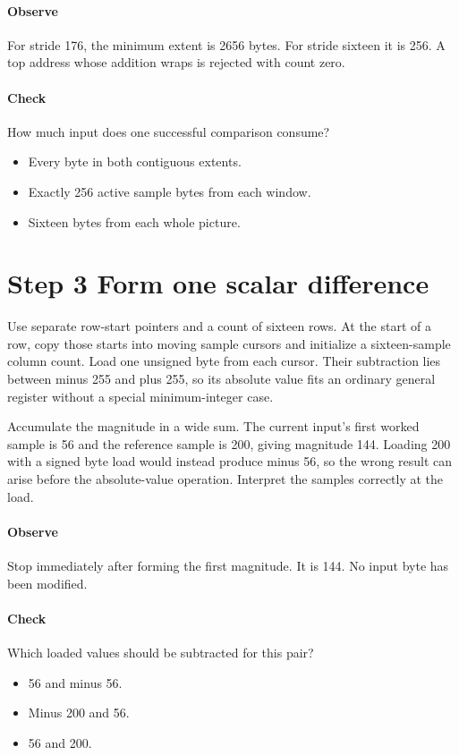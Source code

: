 \paragraph{Observe} For stride 176, the minimum extent is 2656 bytes. For stride
sixteen it is 256. A top address whose addition wraps is rejected with count zero.
\paragraph{Check} How much input does one successful comparison consume?
\begin{itemize}
  \item[A.] Every byte in both contiguous extents.
  \item[B.] Exactly 256 active sample bytes from each window.
  \item[C.] Sixteen bytes from each whole picture.
\end{itemize}

\section{Step 3 Form one scalar difference}\label{h263-sad-s03}
Use separate row-start pointers and a count of sixteen rows. At the start of a
row, copy those starts into moving sample cursors and initialize a sixteen-sample
column count. Load one unsigned byte from each cursor. Their subtraction lies
between minus 255 and plus 255, so its absolute value fits an ordinary general
register without a special minimum-integer case.

Accumulate the magnitude in a wide sum. The current input's first worked sample
is 56 and the reference sample is 200, giving magnitude 144. Loading 200 with a
signed byte load would instead produce minus 56, so the wrong result can arise
before the absolute-value operation. Interpret the samples correctly at the load.

\paragraph{Observe} Stop immediately after forming the first magnitude. It is
144. No input byte has been modified.
\paragraph{Check} Which loaded values should be subtracted for this pair?
\begin{itemize}
  \item[A.] 56 and minus 56.
  \item[B.] Minus 200 and 56.
  \item[C.] 56 and 200.
\end{itemize}

